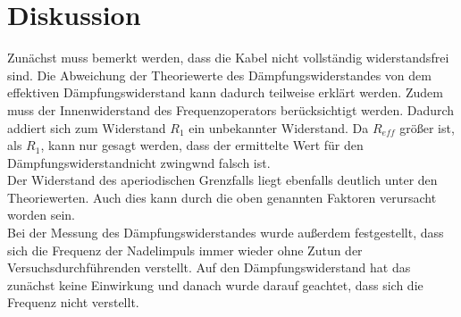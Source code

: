 \section{Diskussion}
\label{sec:Diskussion}

Zunächst muss bemerkt werden, dass die Kabel nicht vollständig widerstandsfrei sind. 
Die Abweichung der Theoriewerte des Dämpfungswiderstandes von dem effektiven Dämpfungswiderstand
kann dadurch teilweise erklärt werden. Zudem muss der Innenwiderstand des Frequenzoperators 
berücksichtigt werden. Dadurch addiert sich zum Widerstand $R_1$ ein unbekannter Widerstand.
Da $R_{eff}$ größer ist, als $R_1$, kann nur gesagt werden, dass der ermittelte Wert für 
den Dämpfungswiderstandnicht zwingwnd falsch ist.\\

Der Widerstand des aperiodischen Grenzfalls liegt ebenfalls deutlich unter den Theoriewerten.
Auch dies kann durch die oben genannten Faktoren verursacht worden sein.\\

Bei der Messung des Dämpfungswiderstandes wurde außerdem festgestellt, dass sich die Frequenz der Nadelimpuls immer 
wieder ohne Zutun der Versuchsdurchführenden verstellt. Auf den Dämpfungswiderstand 
hat das zunächst keine Einwirkung und danach wurde darauf geachtet, dass sich die 
Frequenz nicht verstellt.\\



